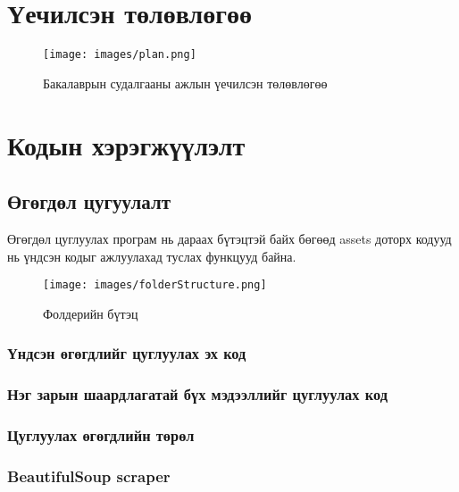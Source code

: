 
\appendix
{}

\chapter{Үечилсэн төлөвлөгөө}
\begin{figure}[h]
	\centering
	\texttt{[image: images/plan.png]}
	\caption{Бакалаврын судалгааны ажлын үечилсэн төлөвлөгөө}
	\label{fig:plan01}
\end{figure}
\chapter{Кодын хэрэгжүүлэлт}

\section{Өгөгдөл цугуулалт}
Өгөгдөл цуглуулах програм нь дараах бүтэцтэй байх бөгөөд assets доторх кодууд нь үндсэн кодыг ажлуулахад туслах функцууд байна.
\begin{figure}[h]
	\centering
	\texttt{[image: images/folderStructure.png]}
	\caption{Фолдерийн бүтэц}
	\label{fig:plan01}
\end{figure}
\subsection{Үндсэн өгөгдлийг цуглуулах эх код}

\subsection{Нэг зарын шаардлагатай бүх мэдээллийг цуглуулах код}

\subsection{Цуглуулах өгөгдлийн төрөл}

\subsection{BeautifulSoup scraper}
